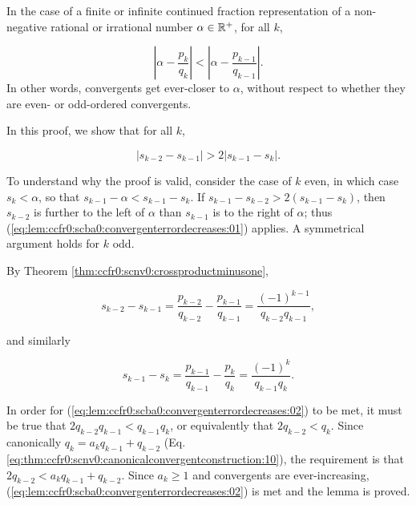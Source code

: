 \begin{vworklemmastatement}
\label{lem:ccfr0:scba0:convergenterrordecreases}
In the case of a finite or infinite continued fraction representation
of a non-negative rational or irrational
number $\alpha \in {\mathbb{R}^+}$, for all $k$,

\begin{equation}
\label{eq:lem:ccfr0:scba0:convergenterrordecreases:01}
\left| {\alpha - \frac{p_k}{q_k}} \right| <  
\left| {\alpha - \frac{p_{k-1}}{q_{k-1}}} \right| .
\end{equation}
In other words, convergents get ever-closer to $\alpha$, without
respect to whether they are even- or odd-ordered convergents.
\end{vworklemmastatement}
\begin{vworklemmaproof}
In this proof, we show that for all $k$,

\begin{equation}
\label{eq:lem:ccfr0:scba0:convergenterrordecreases:02}
| s_{k-2} - s_{k-1} | > 2 | s_{k-1} - s_k | .
\end{equation}

To understand why the proof is valid, consider the case of $k$ even,
in which case $s_k < \alpha$, so that $s_{k-1} - \alpha < s_{k-1} - s_k$.
If $s_{k-1} - s_{k-2} > 2 (s_{k-1} - s_k)$, then
$s_{k-2}$ is further to the left of $\alpha$ than $s_{k-1}$ is to the
right of $\alpha$; thus (\ref{eq:lem:ccfr0:scba0:convergenterrordecreases:01})
applies.  A symmetrical argument holds for $k$ odd.

By Theorem \ref{thm:ccfr0:scnv0:crossproductminusone},

\begin{equation}
\label{eq:lem:ccfr0:scba0:convergenterrordecreases:03}
s_{k-2} - s_{k-1} 
= \frac{p_{k-2}}{q_{k-2}}
- \frac{p_{k-1}}{q_{k-1}}
= \frac{(-1)^{k-1}}{q_{k-2} q_{k-1}} ,
\end{equation}

and similarly 

\begin{equation}
\label{eq:lem:ccfr0:scba0:convergenterrordecreases:04}
s_{k-1} - s_{k} 
= \frac{p_{k-1}}{q_{k-1}}
- \frac{p_{k}}{q_{k}}
= \frac{(-1)^{k}}{q_{k-1} q_{k}} .
\end{equation}

In order for (\ref{eq:lem:ccfr0:scba0:convergenterrordecreases:02})
to be met, it must be true that 
$2 q_{k-2} q_{k-1} < q_{k-1} q_k$, or equivalently that
$2 q_{k-2} < q_k$.  Since canonically $q_k = a_k q_{k-1} + q_{k-2}$
(Eq. \ref{eq:thm:ccfr0:scnv0:canonicalconvergentconstruction:10}), 
the requirement is that $2 q_{k-2} < a_k q_{k-1} + q_{k-2}$.  
Since $a_k \geq 1$ and convergents are ever-increasing,
(\ref{eq:lem:ccfr0:scba0:convergenterrordecreases:02}) is met and the
lemma is proved.
\end{vworklemmaproof}
\vworklemmafooter{}

